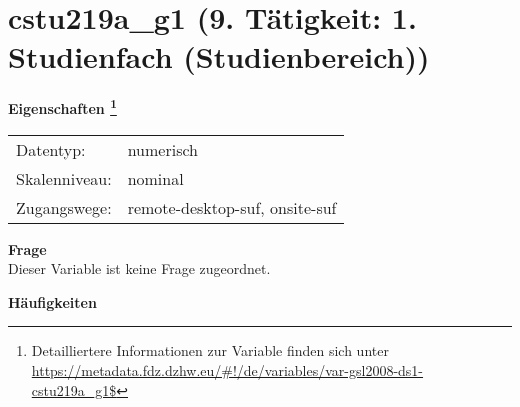 
    \setcounter{footnote}{0}

    \vspace*{-1.8cm}
	\section{cstu219a\_g1 (9. Tätigkeit: 1. Studienfach (Studienbereich))}
	\label{section:cstu219a_g1}



    \vspace*{0.5cm}
    \noindent\textbf{Eigenschaften
	\footnote{Detailliertere Informationen zur Variable finden sich unter
		\url{https://metadata.fdz.dzhw.eu/\#!/de/variables/var-gsl2008-ds1-cstu219a_g1$}}}\\
	\begin{tabularx}{\hsize}{@{}lX}
	Datentyp: & numerisch \\
	Skalenniveau: & nominal \\
	Zugangswege: &
	  remote-desktop-suf, 
	  onsite-suf
 \\
    \end{tabularx}



		\vspace*{0.5cm}
		\noindent\textbf{Frage}\\
		Dieser Variable ist keine Frage zugeordnet.





        		\vspace*{0.5cm}
                \noindent\textbf{Häufigkeiten}

